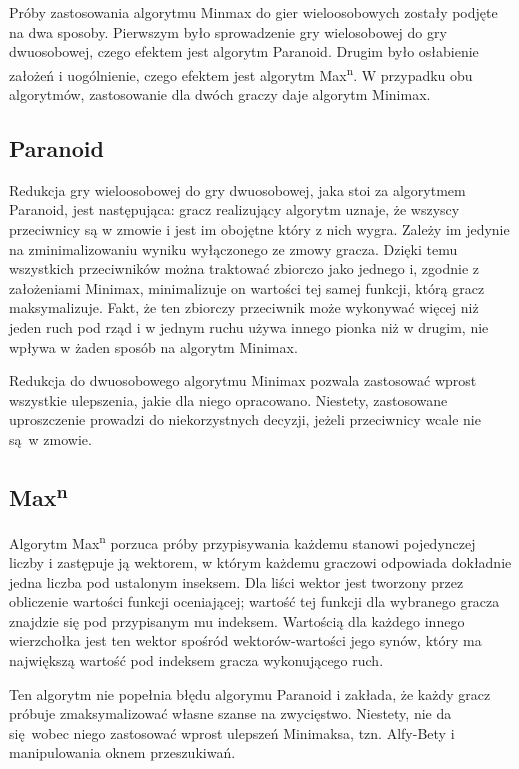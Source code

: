 \documentclass{pracamgr}
\begin{document}
Próby zastosowania algorytmu Minmax do gier wieloosobowych zostały podjęte na dwa sposoby.
Pierwszym było sprowadzenie gry wielosobowej do gry dwuosobowej, czego efektem jest algorytm Paranoid.
Drugim było osłabienie założeń i uogólnienie, czego efektem jest algorytm Max\textsuperscript{n}.
W przypadku obu algorytmów, zastosowanie dla dwóch graczy daje algorytm Minimax.

\subsection{Paranoid}

Redukcja gry wieloosobowej do gry dwuosobowej, jaka stoi za algorytmem Paranoid, jest następująca: gracz realizujący algorytm uznaje, że wszyscy przeciwnicy są w zmowie i jest im obojętne który z nich wygra.
Zależy im jedynie na zminimalizowaniu wyniku wyłączonego ze zmowy gracza.
Dzięki temu wszystkich przeciwników można traktować zbiorczo jako jednego i, zgodnie z założeniami Minimax, minimalizuje on wartości tej samej funkcji, którą gracz maksymalizuje.
Fakt, że ten zbiorczy przeciwnik może wykonywać więcej niż jeden ruch pod rząd i w jednym ruchu używa innego pionka niż w drugim, nie wpływa w żaden sposób na algorytm Minimax.

Redukcja do dwuosobowego algorytmu Minimax pozwala zastosować wprost wszystkie ulepszenia, jakie dla niego opracowano.
Niestety, zastosowane uproszczenie prowadzi do niekorzystnych decyzji, jeżeli przeciwnicy wcale nie są w zmowie\cite{sturtevant}.

\subsection{Max\textsuperscript{n}}

Algorytm Max\textsuperscript{n} porzuca próby przypisywania każdemu stanowi pojedynczej liczby i zastępuje ją wektorem, w którym każdemu graczowi odpowiada dokładnie jedna liczba pod ustalonym inseksem.
Dla liści wektor jest tworzony przez obliczenie wartości funkcji oceniającej; wartość tej funkcji dla wybranego gracza znajdzie się pod przypisanym mu indeksem.
Wartością dla każdego innego wierzchołka jest ten wektor spośród wektorów-wartości jego synów, który ma największą wartość pod indeksem gracza wykonującego ruch.

Ten algorytm nie popełnia błędu algorymu Paranoid i zakłada, że każdy gracz próbuje zmaksymalizować własne szanse na zwycięstwo.
Niestety, nie da się wobec niego zastosować wprost ulepszeń Minimaksa, tzn. Alfy-Bety i manipulowania oknem przeszukiwań.
\end{document}
